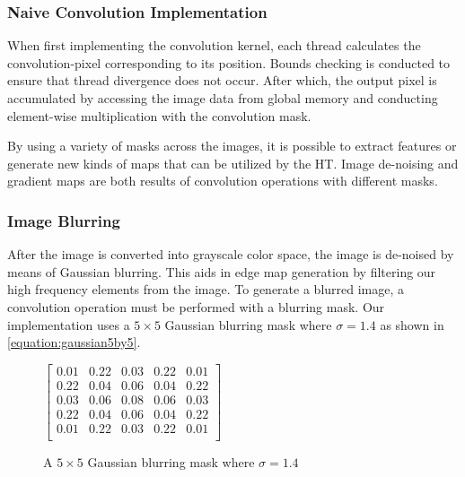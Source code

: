 \documentclass[conference]{IEEEtran}
\begin{document}
\subsubsection{Naive Convolution Implementation}
When first implementing the convolution kernel, each thread calculates the convolution-pixel corresponding to its position. 
Bounds checking is conducted to ensure that thread divergence does not occur. 
After which, the output pixel is accumulated by accessing the image data from global memory and conducting element-wise multiplication with the convolution mask. 















By using a variety of masks across the images, it is possible to extract features or generate new kinds of maps that can be utilized by the HT\@.
Image de-noising and gradient maps are both results of convolution operations with different masks.

\subsubsection{Image Blurring}
After the image is converted into grayscale color space, the image is de-noised by means of Gaussian blurring.
This aids in edge map generation by filtering our high frequency elements from the image.
To generate a blurred image, a convolution operation must be performed with a blurring mask. 
Our implementation uses a $5 \times 5$ Gaussian blurring mask where $\sigma = 1.4$ as shown in \autoref{equation:gaussian5by5}.


\begin{figure}[h] %
  \centering
  $\begin{bmatrix}
  0.01 & 0.22 & 0.03 & 0.22 & 0.01 \\
  0.22 & 0.04 & 0.06 & 0.04 & 0.22 \\
  0.03 & 0.06 & 0.08 & 0.06 & 0.03 \\
  0.22 & 0.04 & 0.06 & 0.04 & 0.22 \\
  0.01 & 0.22 & 0.03 & 0.22 & 0.01 \\
\end{bmatrix}$\caption{A $5 \times 5$ Gaussian blurring mask where $\sigma = 1.4$}\label{equation:gaussian5by5}
\end{figure}
\end{document}
